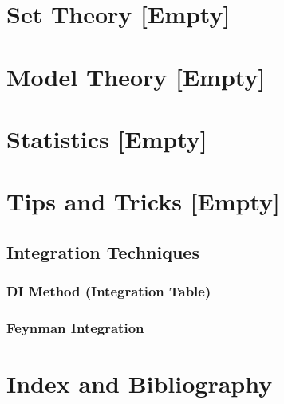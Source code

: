 \documentclass[12pt, english]{book}
\begin{document}
	\part{Set Theory [Empty]} \label{Set Theory Part}
	
	\part{Model Theory [Empty]} \label{Model Theory Part}
	
	\part{Statistics [Empty]} \label{Statistics Part}
	\part{Tips and Tricks [Empty]} \label{Tips and Tricks Part}
	
	\chapter{Integration Techniques} \label{Integration Techniques Chapter - Tips and Tricks}
	
	\section{DI Method (Integration Table)} \label{DI Method Section - Tips and Tricks}
	
	\section{Feynman Integration} \label{Feynman Integration Section - Tips and Tricks}
	
	\backmatter
	\part{Index and Bibliography} \label{Index and Bibliography Part}
	
	\printindex
	
	
	\typeout{}
	
	
\end{document}
